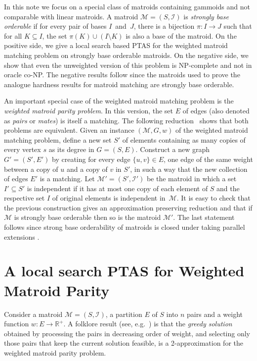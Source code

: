 \documentclass[letterpaper,11pt]{article}
\newcommand{\Real}{{\mathbb R}}
\newcommand{\M}{\mathcal{M}}
\newcommand{\I}{\mathcal{I}}
\theoremstyle{definition}
\begin{document}
In this note we focus on a special class of matroids containing gammoids and not comparable with linear matroids. A matroid $\M=(S,\I)$ is \emph{strongly base orderable} if for every pair of bases $I$~and~$J$, there is a bijection $\pi\colon I \to J$ such that for all $K \subseteq I$, the set $\pi(K) \cup (I\setminus K)$ is also a base of the matroid. On the positive side, we give a local search based PTAS for the weighted matroid matching problem on strongly base orderable matroids. On the negative side, we show that even the unweighted version of this problem is NP-complete and not in oracle co-NP. The negative results follow since the matroids used to prove the analogue hardness results for matroid matching are strongly base orderable.

An important special case of the weighted matroid matching problem is the \emph{weighted matroid parity problem}. In this version, the set $E$ of edges (also denoted as \emph{pairs} or \emph{mates}) is itself a matching. The following reduction~\cite{LeeSV10} shows that both problems are equivalent. Given an instance $(\M,G,w)$ of the weighted matroid matching problem, define a new set $S'$ of elements containing as many copies of every vertex $s$ as its degree in $G=(S,E)$. Construct a new graph $G'=(S',E')$ by creating for every edge $\{u,v\} \in E$, one edge of the same weight between a copy of $u$ and a copy of $v$ in $S'$, in such a way that the new collection of edges $E'$ is a matching. Let $\M'=(S',\I')$ be the matroid in which a set $I' \subseteq S'$ is independent if it has at most one copy of each element of $S$ and the respective set $I$ of original elements is independent in~$\M$. It is easy to check that the previous construction gives an approximation preserving reduction and that if $\M$ is strongly base orderable then so is the matroid $\M'$. The last statement follows since strong base orderability of matroids is closed under taking parallel extensions \cite[Section 42.6c]{Schrijver-book}.

\section{A local search PTAS for Weighted Matroid Parity}
Consider a matroid $\M=(S,\I)$, a partition $E$ of $S$ into $n$ pairs and a weight function $w\colon E\to \Real^+$. A folklore result (see, e.g.~\cite{LeeSV10}) is that the \emph{greedy solution} obtained by processing the pairs in decreasing order of weight, and selecting only those pairs that keep the current solution feasible, is a 2-approximation for the weighted matroid parity problem.
\end{document}
